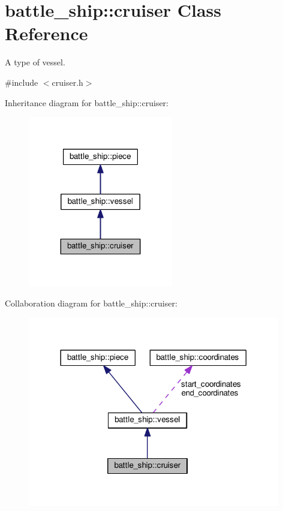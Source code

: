 \hypertarget{classbattle__ship_1_1cruiser}{}\section{battle\+\_\+ship\+:\+:cruiser Class Reference}
\label{classbattle__ship_1_1cruiser}


A type of vessel.  




{\ttfamily \#include $<$cruiser.\+h$>$}



Inheritance diagram for battle\+\_\+ship\+:\+:cruiser\+:
\nopagebreak
\begin{figure}[H]
\begin{center}
\leavevmode
\includegraphics[width=179pt]{classbattle__ship_1_1cruiser__inherit__graph}
\end{center}
\end{figure}


Collaboration diagram for battle\+\_\+ship\+:\+:cruiser\+:
\nopagebreak
\begin{figure}[H]
\begin{center}
\leavevmode
\includegraphics[width=312pt]{classbattle__ship_1_1cruiser__coll__graph}
\end{center}
\end{figure}
